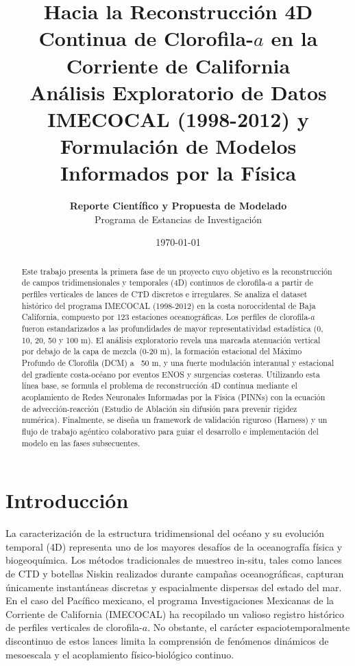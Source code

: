\documentclass[11pt,a4paper]{article}
\title{Hacia la Reconstrucción 4D Continua de Clorofila-$a$ en la Corriente de California\\[0.8cm]
\large Análisis Exploratorio de Datos IMECOCAL (1998-2012) y Formulación de Modelos Informados por la Física}
\author{\textbf{Reporte Científico y Propuesta de Modelado} \\ Programa de Estancias de Investigación}
\date{\today}
\begin{document}
\maketitle

\begin{abstract}
Este trabajo presenta la primera fase de un proyecto cuyo objetivo es la reconstrucción de campos tridimensionales y temporales (4D) continuos de clorofila-$a$ a partir de perfiles verticales de lances de CTD discretos e irregulares. Se analiza el dataset histórico del programa IMECOCAL (1998-2012) en la costa noroccidental de Baja California, compuesto por 123 estaciones oceanográficas. Los perfiles de clorofila-$a$ fueron estandarizados a las profundidades de mayor representatividad estadística (0, 10, 20, 50 y 100 m). El análisis exploratorio revela una marcada atenuación vertical por debajo de la capa de mezcla (0-20 m), la formación estacional del Máximo Profundo de Clorofila (DCM) a ~50 m, y una fuerte modulación interanual y estacional del gradiente costa-océano por eventos ENOS y surgencias costeras. Utilizando esta línea base, se formula el problema de reconstrucción 4D continua mediante el acoplamiento de Redes Neuronales Informadas por la Física (PINNs) con la ecuación de advección-reacción (Estudio de Ablación sin difusión para prevenir rigidez numérica). Finalmente, se diseña un framework de validación riguroso (Harness) y un flujo de trabajo agéntico colaborativo para guiar el desarrollo e implementación del modelo en las fases subsecuentes.
\end{abstract}

\section{Introducción}
La caracterización de la estructura tridimensional del océano y su evolución temporal (4D) representa uno de los mayores desafíos de la oceanografía física y biogeoquímica. Los métodos tradicionales de muestreo in-situ, tales como lances de CTD y botellas Niskin realizados durante campañas oceanográficas, capturan únicamente instantáneas discretas y espacialmente dispersas del estado del mar. En el caso del Pacífico mexicano, el programa Investigaciones Mexicanas de la Corriente de California (IMECOCAL) ha recopilado un valioso registro histórico de perfiles verticales de clorofila-$a$. No obstante, el carácter espaciotemporalmente discontinuo de estos lances limita la comprensión de fenómenos dinámicos de mesoescala y el acoplamiento físico-biológico continuo.
\end{document}
